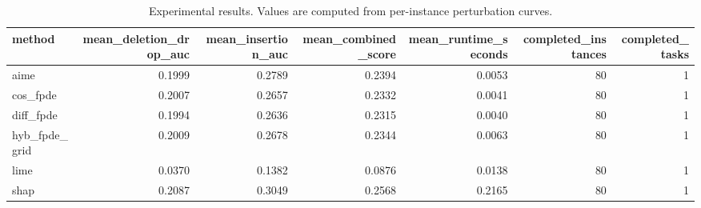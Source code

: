 \begin{table}[t]
\caption{Experimental results. Values are computed from per-instance perturbation curves.}
\label{tab:main_results_computed}
\centering
\begin{tabular}{lrrrrrr}
\toprule
method & mean\_deletion\_drop\_auc & mean\_insertion\_auc & mean\_combined\_score & mean\_runtime\_seconds & completed\_instances & completed\_tasks \\
\midrule
aime & 0.1999 & 0.2789 & 0.2394 & 0.0053 & 80 & 1 \\
cos\_fpde & 0.2007 & 0.2657 & 0.2332 & 0.0041 & 80 & 1 \\
diff\_fpde & 0.1994 & 0.2636 & 0.2315 & 0.0040 & 80 & 1 \\
hyb\_fpde\_grid & 0.2009 & 0.2678 & 0.2344 & 0.0063 & 80 & 1 \\
lime & 0.0370 & 0.1382 & 0.0876 & 0.0138 & 80 & 1 \\
shap & 0.2087 & 0.3049 & 0.2568 & 0.2165 & 80 & 1 \\
\bottomrule
\end{tabular}

\end{table}
